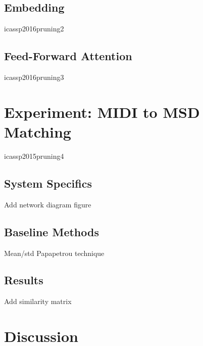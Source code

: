 \subsection{Embedding}

icassp2016pruning2

\subsection{Feed-Forward Attention}

icassp2016pruning3

\section{Experiment: MIDI to MSD Matching}
\label{sec:pse_experiment}

icassp2015pruning4

\subsection{System Specifics}

Add network diagram figure

\subsection{Baseline Methods}

Mean/std
Papapetrou technique

\subsection{Results}

Add similarity matrix

\section{Discussion}
\label{sec:pse_discussion}
